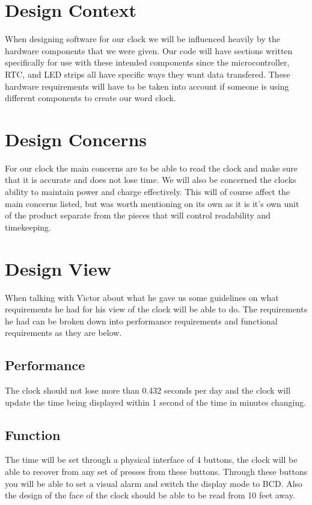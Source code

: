 \documentclass[10pt,draftclsnofoot,onecolumn]{IEEEtran}
\begin{document}
\newpage

\section{Design Context}
When designing software for our clock we will be influenced heavily by the hardware components that we were given. Our code will have sections written specifically for use with these intended components since the microcontroller, RTC, and LED strips all have specific ways they want data transfered. These hardware requirements will have to be taken into account if someone is using different components to create our word clock. 

\section{Design Concerns}
For our clock the main concerns are to be able to read the clock and make sure that it is accurate and does not lose time. 
We will also be concerned the clocks ability to maintain power and charge effectively.
This will of course affect the main concerns listed, but was worth mentioning on its own as it is it's own unit of the product separate from the pieces that will control readability and timekeeping. 


\section{Design View}
When talking with Victor about what he gave us some guidelines on what requirements he had for his view of the clock will be able to do. The requirements he had can be broken down into performance requirements and functional requirements as they are below. 

\subsection{Performance}
The clock should not lose more than 0.432 seconds per day and the clock will update the time being displayed within 1 second of the time in minutes changing.
 

\subsection{Function}
The time will be set through a physical interface of 4 buttons, the clock will be able to recover from any set of presses from these buttons. Through these buttons you will be able to set a visual alarm and switch the display mode to BCD. Also the design of the face of the clock should be able to be read from 10 feet away. 
\end{document}
